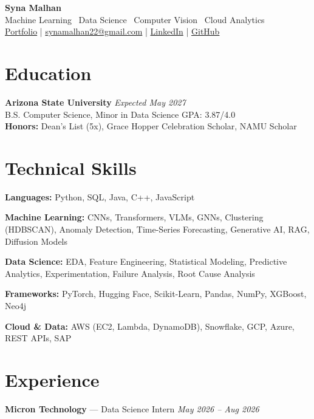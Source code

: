 \documentclass[a4paper,8pt]{extarticle}
\begin{document}
\begin{center}
{\Large \textbf{Syna Malhan}}\\
Machine Learning \textbullet\  Data Science \textbullet\  Computer Vision \textbullet\  Cloud Analytics\\
\href{https://synamalhan.github.io/website/}{Portfolio}
\;|\;
\href{mailto:synamalhan22@gmail.com}{synamalhan22@gmail.com}
\;|\;
\href{https://www.linkedin.com/in/synamalhan/}{LinkedIn}
\;|\;
\href{https://github.com/synamalhan}{GitHub}
\end{center}

\section*{Education}

\noindent
\textbf{Arizona State University} \hfill \textit{Expected May 2027}\\
\noindent
B.S. Computer Science, Minor in Data Science \hfill GPA: 3.87/4.0\\
\noindent
\textbf{Honors:} Dean's List (5x), Grace Hopper Celebration Scholar, NAMU Scholar

\section*{Technical Skills}

\noindent
\textbf{Languages:} Python, SQL, Java, C++, JavaScript

\noindent
\textbf{Machine Learning:} CNNs, Transformers, VLMs, GNNs, Clustering (HDBSCAN), Anomaly Detection, Time-Series Forecasting, Generative AI, RAG, Diffusion Models

\noindent
\textbf{Data Science:} EDA, Feature Engineering, Statistical Modeling, Predictive Analytics, Experimentation, Failure Analysis, Root Cause Analysis

\noindent
\textbf{Frameworks:} PyTorch, Hugging Face, Scikit-Learn, Pandas, NumPy, XGBoost, Neo4j

\noindent
\textbf{Cloud \& Data:} AWS (EC2, Lambda, DynamoDB), Snowflake, GCP, Azure, REST APIs, SAP

\section*{Experience}

\noindent
\textbf{Micron Technology} --- Data Science Intern
\hfill \textit{May 2026 -- Aug 2026}
\end{document}
